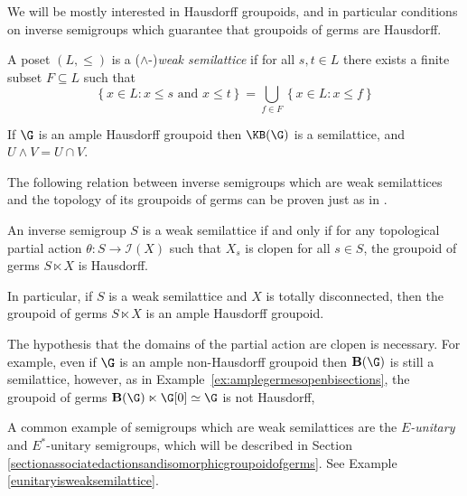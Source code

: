 We will be mostly interested in Hausdorff groupoids, and in particular conditions on inverse semigroups which guarantee that groupoids of germs are Hausdorff.

\begin{definition}
A poset $(L,\leq)$ is a ($\land$-)\emph{weak semilattice} if for all $s,t\in L$ there exists a finite subset $F\subseteq L$ such that
\[\left\{x\in L:x\leq s\text{ and }x\leq t\right\}=\bigcup_{f\in F}\left\{x\in L:x\leq f\right\}\]
\end{definition}

\begin{example}
 If $\G$ is an ample Hausdorff groupoid then $\KB(\G)$ is a semilattice, and $U\land V=U\cap V$.
\end{example}

The following relation between inverse semigroups which are weak semilattices and the topology of its groupoids of germs can be proven just as in \cite[Theorem~5.17]{MR2565546}.

\begin{proposition}\label{prop:weaksemilattice} \cite[Theorem~5.17]{MR2565546}
An inverse semigroup $S$ is a weak semilattice if and only if for any topological partial action $\theta:S\to\mathcal{I}(X)$ such that $X_s$ is clopen for all $s \in S$, the groupoid of germs $S\ltimes X$ is Hausdorff.

In particular, if $S$ is a weak semilattice and $X$ is totally disconnected, then the groupoid of germs $S\ltimes X$ is an ample Hausdorff groupoid.
\end{proposition}

\begin{remark}
The hypothesis that the domains of the partial action are clopen is necessary. For example, even if $\G$ is an ample non-Hausdorff groupoid then $\operatorname{\bf{B}}(\G)$ is still a semilattice, however, as in Example~\ref{ex:amplegermesopenbisections}, the groupoid of germs $\operatorname{\bf{B}}(\G)\ltimes\G[0]\simeq\G$ is not Hausdorff, 
\end{remark}

A common example of semigroups which are weak semilattices are the \emph{$E$-unitary} and $E^*$-unitary semigroups, which will be described in Section \ref{sectionassociatedactionsandisomorphicgroupoidofgerms}. See Example \ref{eunitaryisweaksemilattice}.